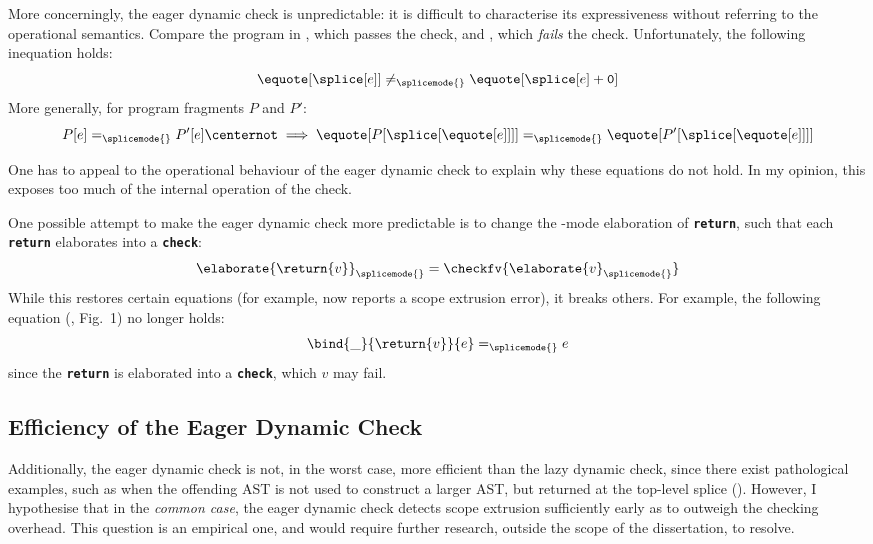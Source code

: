 More concerningly, the eager dynamic check is unpredictable: it is difficult to characterise its expressiveness without referring to the operational semantics. Compare the program in , which passes the check, and , which \textit{fails} the check. Unfortunately, the following inequation holds:
\[\equote[\splice[e]] \neq_{\splicemode{}} \equote[{\splice[e] + \texttt{0}}]\]
More generally, for program fragments $P$ and $P'$:
\[P[e] =_{\splicemode{}} P'[e] \centernot\implies \equote[{P[\splice[{\equote[e]}]]}] =_{\splicemode{}} \equote[{P'[\splice[{\equote[e]}]]}]\]

One has to appeal to the operational behaviour of the eager dynamic check to explain why these equations do not hold. In my opinion, this exposes too much of the internal operation of the check. 

One possible attempt to make the eager dynamic check more predictable is to change the \splicemode{}-mode elaboration of \textbf{\texttt{return}}, such that each \textbf{\texttt{return}} elaborates into a \textbf{\texttt{check}}:
\[\elaborate{\return{v}}_{\splicemode{}} = \checkfv{\elaborate{v}_{\splicemode{}}}\]
While this restores certain equations (for example,  now reports a scope extrusion error), it breaks others. For example, the following equation (\citep{levy-2003}, Fig.\ 1) no longer holds:
\[\bind{\_}{\return{v}}{e} =_{\splicemode{}} e\]
since the \textbf{\texttt{return}} is elaborated into a \textbf{\texttt{check}}, which $v$ may fail.

\subsection{Efficiency of the Eager Dynamic Check}\label{subsection:eager-dynamic-efficiency}
Additionally, the eager dynamic check is not, in the worst case, more efficient than the lazy dynamic check, since there exist pathological examples, such as when the offending AST is not used to construct a larger AST, but returned at the top-level splice (). However, I hypothesise that in the \textit{common case}, the eager dynamic check detects scope extrusion sufficiently early as to outweigh the checking overhead. This question is an empirical one, and would require further research, outside the scope of the dissertation, to resolve. 

